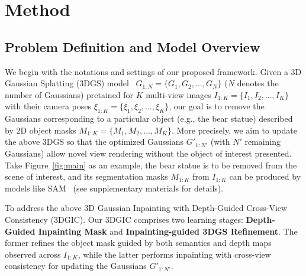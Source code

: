 

\section{Method}
\label{sec:method}

\subsection{Problem Definition and Model Overview}
We begin with the notations and settings of our proposed framework. Given a 3D Gaussian Splatting (3DGS) model~\cite{ye2023gaussiangrouping} $G_{1:N} = \{G_1, G_2, ..., G_N \}$ ($N$ denotes the number of Gaussians) pretained for $K$ multi-view images $I_{1:K} = \{I_1, I_2, ..., I_K\}$ with their camera poses $\xi_{1:K} = \{\xi_1, \xi_2, ..., \xi_K\}$, our goal is to remove the Gaussians corresponding to a particular object (e.g., the bear statue) described by 2D object masks $M_{1:K} = \{M_1, M_2, ..., M_K\}$. More precisely, we aim to update the above 3DGS so that the optimized Gaussians $G'_{1:N'}$ (with $N'$ remaining Gaussians) allow novel view rendering without the object of interest presented. Take Figure~\ref{fig:main} as an example, the bear statue is to be removed from the scene of interest, and its segmentation masks $M_{1:K}$ from $I_{1:K}$ can be produced by models like SAM~\cite{kirillov2023sam} (see supplementary materials for details). 


To address the above 3D Gaussian Inpainting with Depth-Guided Cross-View Consistency (3DGIC). Our 3DGIC comprises two learning stages: \textbf{Depth-Guided Inpainting Mask} and \textbf{Inpainting-guided 3DGS Refinement}. The former refines the object mask guided by both semantics and depth maps observed across $I_{1:K}$, while the latter performs inpainting with cross-view consistency for updating the Gaussians $G'_{1:N'}$.



